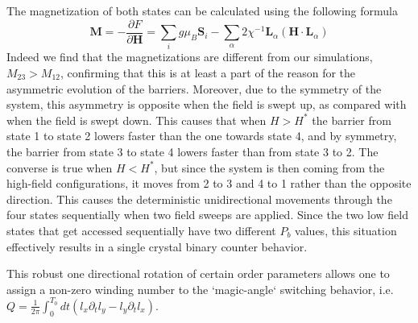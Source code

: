 The magnetization of both states can be calculated using the following formula
\begin{equation}
	\mathbf{M} = -\frac{\partial{F}}{\partial{\mathbf{H}}} = \sum_i g \mu_{B} \mathbf{S}_i - \sum_{\alpha} 2 \chi^{-1}\mathbf{L}_{\alpha} (\mathbf{H} \cdot \mathbf{L}_{\alpha}) 
\end{equation}
Indeed we find that the magnetizations are different from our simulations, $M_{23} > M_{12}$, confirming that this is at least a part of the reason for the asymmetric evolution of the barriers.
Moreover, due to the symmetry of the system, this asymmetry is opposite when the field is swept up, as compared with when the field is swept down.
This causes that when $H > H^*$ the barrier from state 1 to state 2 lowers faster than the one towards state 4, and by symmetry, the barrier from state 3 to state 4 lowers faster than from state 3 to 2.
The converse is true when $H < H^*$, but since the system is then coming from the high-field configurations, it moves from 2 to 3 and 4 to 1 rather than the opposite direction.
This causes the deterministic unidirectional movements through the four states sequentially when two field sweeps are applied.
Since the two low field states that get accessed sequentially have two different $P_b$ values, this situation effectively results in a single crystal binary counter behavior.  

This robust one directional rotation of certain order parameters allows one to assign a non-zero winding number to the `magic-angle` switching behavior, i.e. $Q=\frac{1}{2\pi}\int_0^{T_0} dt (l_x\partial_t l_y - l_y \partial_t l_x)$. 


